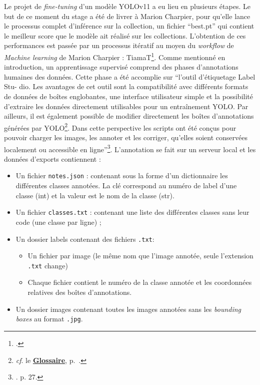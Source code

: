 Le projet de \textit{fine-tuning} d'un modèle YOLOv11 a eu lieu en plusieurs étapes. Le but de ce moment du stage a été de livrer à Marion Charpier, pour qu'elle lance le processus complet d'inférence sur la collection, un fichier \enquote{best.pt} qui contient le meilleur score que le modèle ait réalisé sur les collections. L'obtention de ces performances est passée par un processus itératif au moyen du \textit{workflow} de \textit{Machine learning} de Marion Charpier : TiamaT\footnote{\cite{chaouabti_chaouabtitiamat_2025}.}. Comme mentionné en introduction, un apprentissage supervisé comprend des phases d'annotations humaines des données. Cette phase a été accomplie sur \enquote{l’outil d’étiquetage Label Stu-
dio. Les avantages de cet outil sont la compatibilité avec différents
formats de données de boîtes englobantes, une interface utilisateur simple et la possibilité
d’extraire les données directement utilisables pour un entraînement YOLO.
Par ailleurs, il est également possible de modifier directement les boîtes d’annotations générées par YOLO\footnote{\textit{cf}. le \textbf{\hyperref[sec:Glossaire]{Glossaire}}, p.~\pageref{sec:Glossaire}.}. Dans cette perspective les scripts ont été conçus pour pouvoir charger les images, les annoter et les corriger, qu’elles soient conservées localement ou accessible en ligne}\footnote{\cite{charpier_computer_2023}. p. 27.}. L’annotation se fait sur un serveur local et les données d’exports contiennent : 
\begin{itemize}
    \item Un fichier \texttt{notes.json} : contenant sous la forme d'un dictionnaire les différentes classes annotées. La clé correspond au numéro de label d'une classe (int) et la valeur est le nom de la classe (str).
    \item Un fichier \texttt{classes.txt} : contenant une liste des différentes classes sans leur code (une classe par ligne) ;
    \item Un dossier labels contenant des fichiers \texttt{.txt}:
    \begin{itemize}
        \item Un fichier par image (le même nom que l'image annotée, seule l'extension \texttt{.txt} change)
        \item Chaque fichier contient le numéro de la classe annotée et les coordonnées relatives des boîtes d’annotations. 
    \end{itemize}
    \item Un dossier images contenant toutes les images annotées sans les \textit{bounding boxes} au format \texttt{.jpg}.
\end{itemize}

